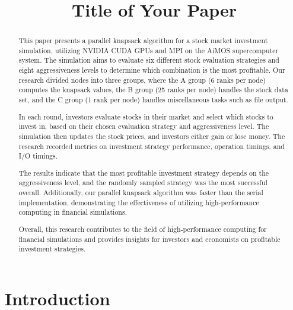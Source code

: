 \documentclass[conference]{IEEEtran}
\begin{document}
\title{Title of Your Paper}

\author{
\and
{}
\and
{}
\and
{}
}

\maketitle

\begin{abstract}
This paper presents a parallel knapsack algorithm for a stock market investment simulation, utilizing NVIDIA CUDA GPUs and MPI on the AiMOS supercomputer system. The simulation aims to evaluate six different stock evaluation strategies and eight aggressiveness levels to determine which combination is the most profitable. Our research divided nodes into three groups, where the A group (6 ranks per node) computes the knapsack values, the B group (25 ranks per node) handles the stock data set, and the C group (1 rank per node) handles miscellaneous tasks such as file output.

In each round, investors evaluate stocks in their market and select which stocks to invest in, based on their chosen evaluation strategy and aggressiveness level. The simulation then updates the stock prices, and investors either gain or lose money. The research recorded metrics on investment strategy performance, operation timings, and I/O timings.

The results indicate that the most profitable investment strategy depends on the aggressiveness level, and the randomly sampled strategy was the most successful overall. Additionally, our parallel knapsack algorithm was faster than the serial implementation, demonstrating the effectiveness of utilizing high-performance computing in financial simulations.

Overall, this research contributes to the field of high-performance computing for financial simulations and provides insights for investors and economists on profitable investment strategies.





\end{abstract}

\section{Introduction}
\label{sec:introduction}
\end{document}
